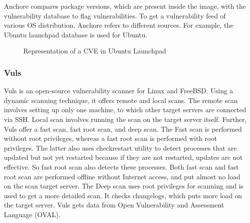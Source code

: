 \documentclass[a4paper,num-refs]{oup-contemporary}
\begin{document}
Anchore compares package versions, which are present inside the
image, with the vulnerability database to flag vulnerabilities.
To get a vulnerability feed of various OS distribution, Anchore refers to
different sources. For example, the Ubuntu launchpad database is used for Ubuntu.

\begin{figure}[H]
        \caption{\label{example} Representation of a CVE in Ubuntu Launchpad}
\end{figure}



\subsubsection{Vuls}

Vuls is an open-source vulnerability scanner for Linux and FreeBSD.
Using a dynamic scanning technique, it offers
remote and local scans. The remote scan involves setting up only one machine, to
which other target servers are connected via SSH. Local scan involves running
the scan on the target server itself. Further, Vuls offer a fast scan, fast root scan,
and deep scan.
The Fast scan is performed without root privileges, whereas a fast root scan is
performed with root privileges. The latter also uses checkrestart utility to 
detect processes that are updated but not yet restarted because if they are not
restarted, updates are not effective. So fast root scan also detects these
processes. Both fast scan and fast root scan are performed offline without Internet
access, and put almost no load on the scan target server. The Deep scan uses
root privileges for scanning and is used to get a more detailed scan. It checks
changelogs, which puts more load on the target server.
Vuls gets data from Open Vulnerability and Assessment Language (OVAL).
\end{document}
